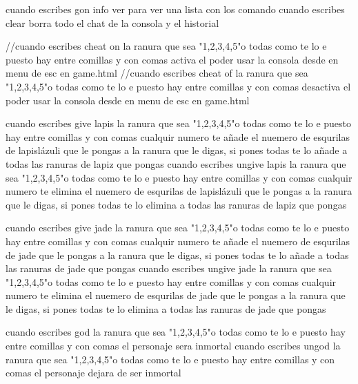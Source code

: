 cuando escribes gon info ver para ver una lista con los comando 
cuando escribes clear borra todo el chat de la consola y el historial

//cuando escribes cheat on {la ranura que sea "1,2,3,4,5"o todas como te lo e puesto hay entre comillas y con comas} activa el poder usar la consola desde en menu de esc en game.html
//cuando escribes cheat of {la ranura que sea "1,2,3,4,5"o todas como te lo e puesto hay entre comillas y con comas} desactiva el poder usar la consola desde en menu de esc en game.html 

cuando escribes give lapis {la ranura que sea "1,2,3,4,5"o todas como te lo e puesto hay entre comillas y con comas} cualquir numero te añade el nuemero de esqurilas de lapislázuli que le pongas a la ranura que le digas, si pones todas te lo añade a todas las ranuras de lapiz que pongas
cuando escribes ungive lapis {la ranura que sea "1,2,3,4,5"o todas como te lo e puesto hay entre comillas y con comas} cualquir numero te elimina el nuemero de esqurilas de lapislázuli que le pongas a la ranura que le digas, si pones todas te lo elimina a todas las ranuras de lapiz que pongas

cuando escribes give jade {la ranura que sea "1,2,3,4,5"o todas como te lo e puesto hay entre comillas y con comas} cualquir numero te añade el nuemero de esqurilas de jade que le pongas a la ranura que le digas, si pones todas te lo añade a todas las ranuras de jade que pongas
cuando escribes ungive jade {la ranura que sea "1,2,3,4,5"o todas como te lo e puesto hay entre comillas y con comas} cualquir numero te elimina el nuemero de esqurilas de jade que le pongas a la ranura que le digas, si pones todas te lo elimina a todas las ranuras de jade que pongas

cuando escribes god {la ranura que sea "1,2,3,4,5"o todas como te lo e puesto hay entre comillas y con comas} el personaje sera inmortal
cuando escribes ungod {la ranura que sea "1,2,3,4,5"o todas como te lo e puesto hay entre comillas y con comas} el personaje dejara de ser inmortal




